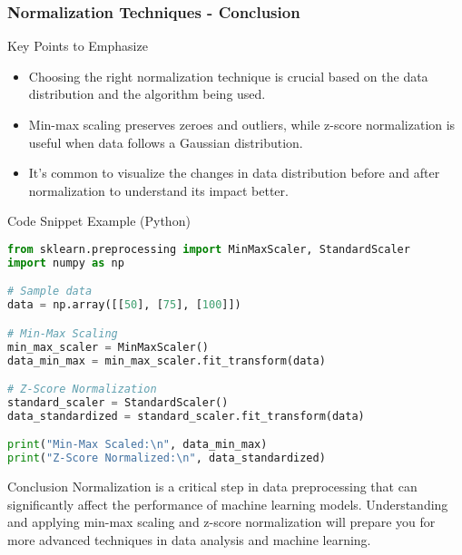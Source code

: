 \documentclass[aspectratio=169]{beamer}
\begin{document}
\begin{frame}[fragile]
    \frametitle{Normalization Techniques - Conclusion}
    \begin{block}{Key Points to Emphasize}
        \begin{itemize}
            \item Choosing the right normalization technique is crucial based on the data distribution and the algorithm being used.
            \item Min-max scaling preserves zeroes and outliers, while z-score normalization is useful when data follows a Gaussian distribution.
            \item It’s common to visualize the changes in data distribution before and after normalization to understand its impact better.
        \end{itemize}
    \end{block}

    \begin{block}{Code Snippet Example (Python)}
    \begin{lstlisting}[language=Python]
from sklearn.preprocessing import MinMaxScaler, StandardScaler
import numpy as np

# Sample data
data = np.array([[50], [75], [100]])

# Min-Max Scaling
min_max_scaler = MinMaxScaler()
data_min_max = min_max_scaler.fit_transform(data)

# Z-Score Normalization
standard_scaler = StandardScaler()
data_standardized = standard_scaler.fit_transform(data)

print("Min-Max Scaled:\n", data_min_max)
print("Z-Score Normalized:\n", data_standardized)
    \end{lstlisting}
    \end{block}
    
    \begin{block}{Conclusion}
        Normalization is a critical step in data preprocessing that can significantly affect the performance of machine learning models. Understanding and applying min-max scaling and z-score normalization will prepare you for more advanced techniques in data analysis and machine learning.
    \end{block}
\end{frame}
\end{document}
